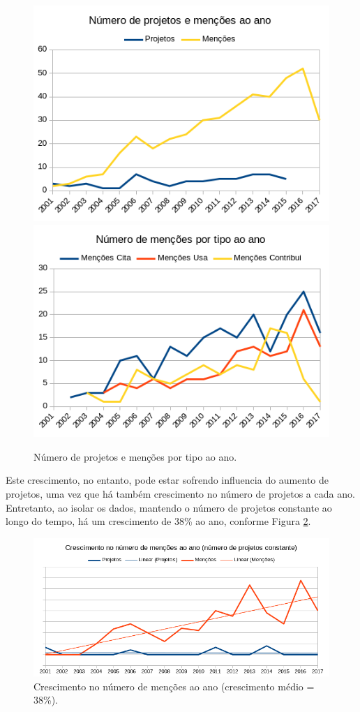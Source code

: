 \begin{figure}[ht]
  \centering
  \includegraphics[scale=0.6]{imagens/mentions-projects-by-year.png}
  \includegraphics[scale=0.6]{imagens/mentions-type-by-year.png}
  \caption{Número de projetos e menções por tipo ao ano.}
  \label{mentions-by-year}
\end{figure}

Este crescimento, no entanto, pode estar sofrendo influencia do aumento de
projetos, uma vez que há também crescimento no número de projetos a cada ano.
Entretanto, ao isolar os dados, mantendo o número de projetos constante ao longo
do tempo, há um crescimento de 38\% ao ano, conforme Figura
\ref{mentions-trend}.

\begin{figure}[ht]
  \center
  \includegraphics[scale=0.6]{imagens/mentions-trend.png}
  \caption{Crescimento no número de menções ao ano (crescimento médio = 38\%).}
  \label{mentions-trend}
\end{figure}

